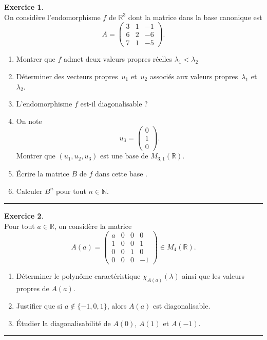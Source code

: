 \documentclass[a4paper,10pt]{article}
\theoremstyle{definition}
\theoremstyle{definition}
\newtheorem{exo}{Exercice}
\newcommand{\R}{\mathbb{R}}
\newcommand{\N}{\mathbb{N}}
\begin{document}
\begin{exo}\textbf{}\quad\\[0.25cm]
 On considère l'endomorphisme $f$ de $\R^3$ dont la matrice dans la
base canonique est
\[
A = \begin{pmatrix}
3&1&{ - 1}\\ 6&2&{ - 6}\\ 7&1&{ - 5}
\end{pmatrix}.
\]
\begin{enumerate}
	\item Montrer que $f$ admet deux valeurs propres réelles $\lambda_1
	< \lambda _2$
	\item Déterminer des vecteurs propres~$u_1$ et~$u_2$ associés aux
	valeurs propres~$\lambda_1$ et~$\lambda_2$.
	\item L'endomorphisme $f$ est-il diagonalisable ?
	\item On note
	\[ u_3 = \begin{pmatrix} 0 \\ 1 \\ 0 \end{pmatrix}. \]
	Montrer que $(u_1, u_2, u_3)$ est une base de $M_{3,1}(\R)$.
	\item Écrire la matrice $B$ de $f$ dans cette base .   
	\item Calculer $B^n$ pour tout $n \in \N$.
\end{enumerate}

\centering
\rule{1\linewidth}{0.6pt}
\end{exo}

\begin{exo}\textbf{}\quad\\[0.25cm]
  Pour tout $a \in \R$, on considère la matrice
\[
A(a) = \begin{pmatrix}
a&0&0&0\\
1&0&0&1\\
0&0&1&0\\
0&0&0&-1
\end{pmatrix} \in M_4(\R).
\]
\begin{enumerate}	
	\item Déterminer le polynôme caractéristique $\chi_{A(a)}(\lambda)$
	ainsi que les valeurs propres de $A(a)$.
	\item Justifier que si $a \not\in \{-1,0, 1\}$, alors $A(a)$ est
	diagonalisable.
	\item Étudier la diagonalisabilité de $A(0)$, $A(1)$ et $A(-1)$.\end{enumerate}
\centering
\rule{1\linewidth}{0.6pt}
\end{exo}
\end{document}
